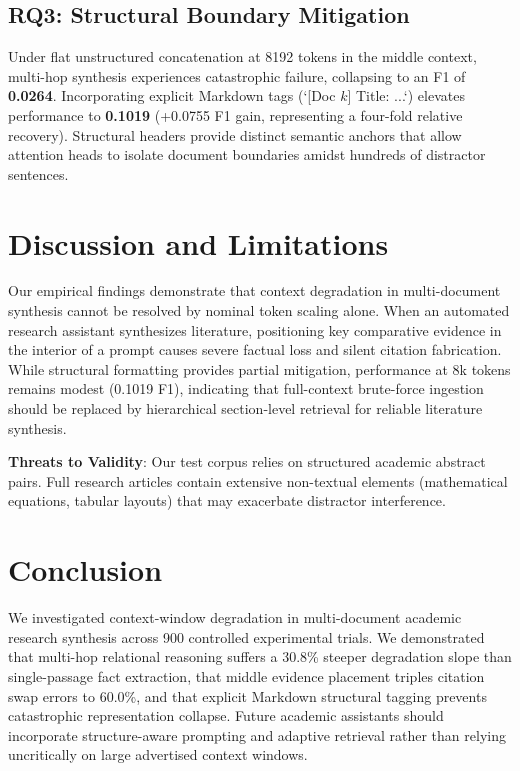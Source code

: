 \documentclass[manuscript,screen,oneside]{acmart}
\begin{document}
\subsection{RQ3: Structural Boundary Mitigation}
Under flat unstructured concatenation at 8192 tokens in the middle context, multi-hop synthesis experiences catastrophic failure, collapsing to an F1 of \textbf{0.0264}. Incorporating explicit Markdown tags (`[Doc $k$] Title: ...`) elevates performance to \textbf{0.1019} (+0.0755 F1 gain, representing a four-fold relative recovery). Structural headers provide distinct semantic anchors that allow attention heads to isolate document boundaries amidst hundreds of distractor sentences.

\section{Discussion and Limitations}\label{sec:discussion}
Our empirical findings demonstrate that context degradation in multi-document synthesis cannot be resolved by nominal token scaling alone. When an automated research assistant synthesizes literature, positioning key comparative evidence in the interior of a prompt causes severe factual loss and silent citation fabrication. While structural formatting provides partial mitigation, performance at 8k tokens remains modest (0.1019 F1), indicating that full-context brute-force ingestion should be replaced by hierarchical section-level retrieval for reliable literature synthesis.

\textbf{Threats to Validity}: Our test corpus relies on structured academic abstract pairs. Full research articles contain extensive non-textual elements (mathematical equations, tabular layouts) that may exacerbate distractor interference.

\section{Conclusion}\label{sec:conclusion}
We investigated context-window degradation in multi-document academic research synthesis across 900 controlled experimental trials. We demonstrated that multi-hop relational reasoning suffers a 30.8\% steeper degradation slope than single-passage fact extraction, that middle evidence placement triples citation swap errors to 60.0\%, and that explicit Markdown structural tagging prevents catastrophic representation collapse. Future academic assistants should incorporate structure-aware prompting and adaptive retrieval rather than relying uncritically on large advertised context windows.



\end{document}
